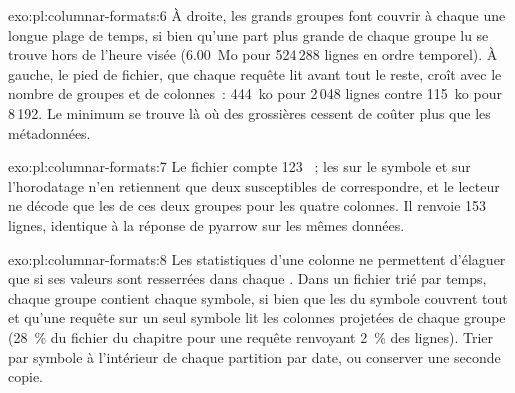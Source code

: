\begin{solution}{exo:pl:columnar-formats:6}
À droite, les grands groupes font couvrir à chaque  une longue plage de temps, si bien qu'une part plus grande de chaque groupe lu se trouve hors de l'heure visée
(6.00~Mo pour 524\,288 lignes en ordre temporel). À gauche, le pied de fichier, que chaque requête lit avant tout le reste, croît avec le
nombre de groupes et de colonnes~: 444~ko pour 2\,048 lignes contre 115~ko pour 8\,192. Le minimum se trouve là où des  grossières cessent de coûter
plus que les métadonnées.
\end{solution}

\begin{solution}{exo:pl:columnar-formats:7}
Le fichier compte 123 ~; les  sur le symbole et sur l'horodatage n'en retiennent que deux susceptibles de correspondre, et le lecteur ne décode que
les  de ces deux groupes pour les quatre colonnes. Il renvoie 153 lignes, identique à la réponse de pyarrow sur les mêmes données.
\end{solution}

\begin{solution}{exo:pl:columnar-formats:8}
Les statistiques d'une colonne ne permettent d'élaguer que si ses valeurs sont resserrées dans chaque . Dans un fichier trié par temps, chaque groupe contient chaque
symbole, si bien que les  du symbole couvrent tout et qu'une requête sur un seul symbole lit les colonnes projetées de chaque groupe (28~\% du
fichier du chapitre pour une requête renvoyant 2~\% des lignes). Trier par symbole à l'intérieur de chaque partition par date, ou conserver une seconde copie.
\end{solution}

